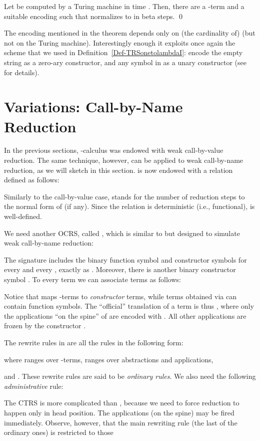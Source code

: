 \documentclass{LMCS}
\newenvironment{varitemize}
{
\begin{list}{\labelitemi}
{\setlength{\itemsep}{0.0mm}
 \setlength{\topsep}{0.0mm}
 \setlength{\parindent}{0.0mm}
 \setlength{\parskip}{0.0mm}
 \setlength{\parsep}{0.0mm}
 \setlength{\partopsep}{0.0mm}
 \setlength{\leftmargin}{15pt}
 \setlength{\labelsep}{5pt}
 \setlength{\labelwidth}{10pt}}}
{
 \end{list} 
}
\newcounter{number}
\begin{document}
\begin{thm}
Let  be computed by a Turing machine
 in time . Then, there are a -term 
and a suitable encoding  
such that  normalizes to  in 
 beta steps. \qed
\end{thm}

The encoding  mentioned in the theorem depends only on (the cardinality of) 
 (but not on the Turing machine). 
Interestingly enough it exploits once again the scheme that we used in Definition~\ref{Def-TRSonetolambdaI}: encode the empty string  as a zero-ary constructor,
and any symbol in  as a unary constructor (see~\cite{CIE2006} for details).
\section{Variations: Call-by-Name Reduction}
\label{sect:HeadReduction}
In the previous sections, -calculus was endowed with weak call-by-value reduction.
The same technique, however, can be applied to weak call-by-name reduction, as we will sketch in
this section.  is now endowed with a relation  defined
as follows:

Similarly to the call-by-value case,  stands for the number of
reduction steps to the normal form of  (if any). Since the relation
 is deterministic (i.e., functional),  is well-defined.

We need another OCRS, called , which is similar to  but designed
to simulate weak call-by-name reduction:
\begin{varitemize}
\item
  The signature  includes the binary function symbol  and
  constructor symbols  for every  and
  every , exactly as . Moreover, there is another
  binary constructor symbol . 
  To every term  we can associate
  terms  as follows:
  
  Notice that  maps -terms to \emph{constructor} terms, while
  terms obtained via  can contain function symbols. The ``official'' translation of a term  is thus , where only the applications ``on the spine'' of  are  encoded with . All other applications are frozen by the constructor .
\item
    The rewrite rules in  are all the rules in the following form:
    
    where  ranges over -terms,  ranges over abstractions and
    applications,
    
    and . These rewrite rules
    are said to be \emph{ordinary rules}. We also need the following \emph{administrative} rule:
    
\end{varitemize}
The CTRS  is more complicated than , because we need to force reduction to happen only in head position. The applications  (on the spine) may be fired immediately.
Observe, however, that the main rewriting rule (the last of the ordinary ones) is restricted to those 
\end{document}
